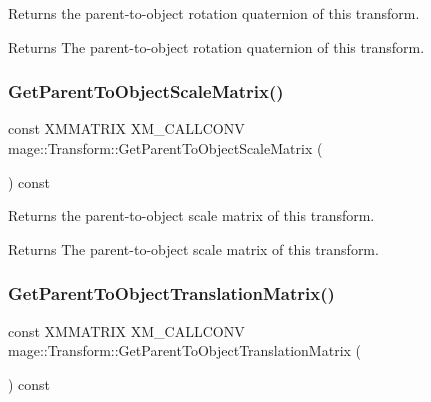 Returns the parent-\/to-\/object rotation quaternion of this transform.

\begin{DoxyReturn}{Returns}
The parent-\/to-\/object rotation quaternion of this transform. 
\end{DoxyReturn}
\hypertarget{classmage_1_1_transform_a77a9313c62c19dd49c11f5fa30fa2ac5}{}\label{classmage_1_1_transform_a77a9313c62c19dd49c11f5fa30fa2ac5} 
\subsubsection{\texorpdfstring{Get\+Parent\+To\+Object\+Scale\+Matrix()}{GetParentToObjectScaleMatrix()}}
{\footnotesize\ttfamily const X\+M\+M\+A\+T\+R\+IX X\+M\+\_\+\+C\+A\+L\+L\+C\+O\+NV mage\+::\+Transform\+::\+Get\+Parent\+To\+Object\+Scale\+Matrix (\begin{DoxyParamCaption}{ }\end{DoxyParamCaption}) const\hspace{0.3cm}{\ttfamily [noexcept]}}

Returns the parent-\/to-\/object scale matrix of this transform.

\begin{DoxyReturn}{Returns}
The parent-\/to-\/object scale matrix of this transform. 
\end{DoxyReturn}
\hypertarget{classmage_1_1_transform_af59262c0537f9ecb6ab9af0b6dbc70d2}{}\label{classmage_1_1_transform_af59262c0537f9ecb6ab9af0b6dbc70d2} 
\subsubsection{\texorpdfstring{Get\+Parent\+To\+Object\+Translation\+Matrix()}{GetParentToObjectTranslationMatrix()}}
{\footnotesize\ttfamily const X\+M\+M\+A\+T\+R\+IX X\+M\+\_\+\+C\+A\+L\+L\+C\+O\+NV mage\+::\+Transform\+::\+Get\+Parent\+To\+Object\+Translation\+Matrix (\begin{DoxyParamCaption}{ }\end{DoxyParamCaption}) const\hspace{0.3cm}{\ttfamily [noexcept]}}


